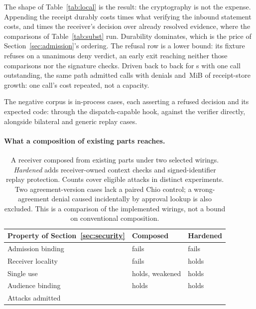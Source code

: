 The shape of Table~\ref{tab:local} is the result: the cryptography is not the
expense. Appending the receipt durably costs
 times what
verifying the inbound statement costs, and
 times the
receiver's decision over already resolved evidence, where the comparisons of
Table~\ref{tab:subst} run. Durability dominates, which is the price of
Section~\ref{sec:admission}'s ordering. The refusal row is a lower bound: its
fixture refuses on a unanimous deny verdict, an early exit reaching neither
those comparisons nor the signature checks. Driven back to back for
\PSSustainedSeconds{} s with one call outstanding, the same path admitted
\PSSustainedCalls{} calls with \PSSustainedDenials{} denials and
\,MiB of receipt-store
growth: one call's cost repeated, not a capacity.

The negative corpus is \PSThreatCaseCount{} in-process cases, each asserting a
refused decision and its expected code: \PSThreatDispatchCaseCount{} through the
dispatch-capable hook, \PSThreatVerifierCaseCount{} against the verifier
directly, alongside \PSBilateralReplayCases{} bilateral and
\PSGenericReplayCases{} generic replay cases.

\paragraph{What a composition of existing parts reaches.}
\begin{table}[!tb]
\centering
\small
\caption{A receiver composed from \PSBaseParts{} existing parts under two selected wirings. \emph{Hardened} adds receiver-owned context checks and signed-identifier replay protection. Counts cover \PSBaseNegativeAttacks{} eligible attacks in \PSBaseNegativeDistinctDrives{} distinct experiments. Two agreement-version cases lack a paired Chio control; a wrong-agreement denial caused incidentally by approval lookup is also excluded. This is a comparison of the implemented wirings, not a bound on conventional composition.}
\label{tab:baseline}
\begin{tabular}{@{}lll@{}}
\toprule
Property of Section~\ref{sec:security} & Composed & Hardened \\
\midrule
Admission binding & fails & fails \\
Receiver locality & fails & holds \\
Single use & holds, weakened & holds \\
Audience binding & holds & holds \\
\midrule
Attacks admitted & \PSBaseComposedAdmits{} & \PSBaseHardenedAdmits{} \\
\bottomrule
\end{tabular}
\end{table}

